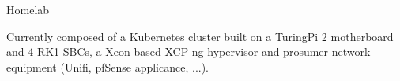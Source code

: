 

\begin{cventries}

  \cventry
    {Homelab} %
    {} %
    {} %
    {} %
    {
      \begin{cvitems} %
        \item {Currently composed of a Kubernetes cluster built on a TuringPi 2 motherboard and 4 RK1 SBCs, a Xeon-based XCP-ng hypervisor and prosumer network equipment (Unifi, pfSense applicance, ...).}
      \end{cvitems}
    }



\end{cventries}
